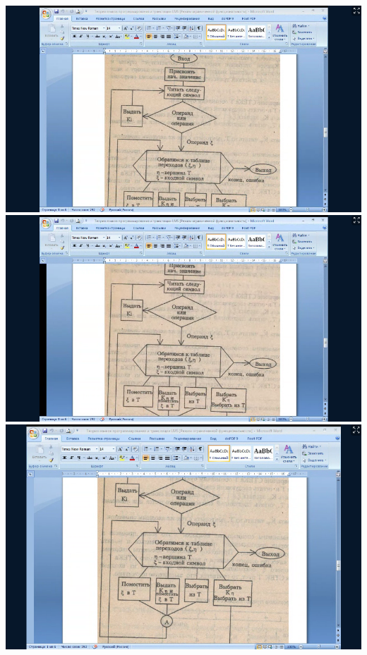 \documentclass{article}
\begin{document}
    \begin{table}
        
    \end{table}
    \includegraphics[scale=0.5]{../pictures/2.png}
    \includegraphics[scale=0.5]{../pictures/3.png}
    \includegraphics[scale=0.5]{../pictures/4.png}
\end{document}
